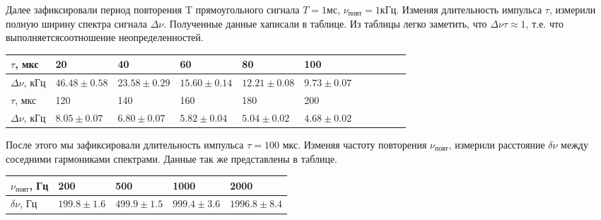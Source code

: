 \documentclass[a4paper,12pt]{article}
\begin{document}
\FloatBarrier

Далее зафиксировали период повторения T прямоугольного сигнала $T = 1мс$, $\nu_{\text{повт}} = 1кГц$. Изменяя длительность импульса $\tau$, измерили полную ширину спектра сигнала $\Delta \nu$. Полученные данные хаписали в таблице. Из таблицы легко заметить, что $\Delta \nu \tau \approx 1$, т.е. что выполняетсясоотношение неопределенностей.


\begin{center}
\begin{tabular}{|l|l|l|l|l|l|l|l|l|l|l|}
\hline
$\tau$, мкс                  & 20    		& 40    	   & 60    	      & 80    		 & 100             \\ \hline
$\Delta \nu$, кГц            & $46.48 \pm 0.58$ & $23.58 \pm 0.29$ & $15.60 \pm 0.14$ & $12.21 \pm 0.08$ & $9.73 \pm 0.07$ \\ \hline 
$\tau$, мкс		     & 120    		& 140    	   & 160    	      & 180    		 & 200             \\ \hline
$\Delta \nu$, кГц	     & $8.05 \pm 0.07$  & $6.80 \pm 0.07$  & $5.82 \pm 0.04$  & $5.04 \pm 0.02$  & $4.68 \pm 0.02$ \\ \hline
\end{tabular}
\end{center}


После этого мы зафиксировали длительность импульса $\tau = 100$ мкс. Изменяя частоту повторения $\nu_{\text{повт}}$, измерили расстояние $\delta \nu$ между соседними гармониками спектрами. Данные так же представлены в таблице.

\begin{center}
\begin{tabular}{|l|l|l|l|l|}
\hline
$\nu_{\text{повт}}$, Гц     & 200    	      & 500    		& 1000    	  & 2000             \\ \hline
$\delta \nu$, Гц            & $199.8 \pm 1.6$ & $499.9 \pm 1.5$ & $999.4 \pm 3.6$ & $1996.8 \pm 8.4$ \\ \hline
\end{tabular}
\end{center}

\FloatBarrier
\end{document}
